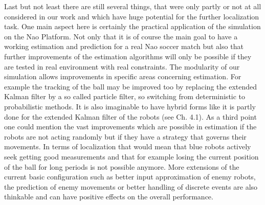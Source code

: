 Last but not least there are still several things, that were only partly or not at all considered in our work and which have huge potential for the further localization task. One main aspect here is certainly the practical application of the simulation on the Nao Platform. Not only that it is of course the main goal to have a working estimation and prediction for a real Nao soccer match but also that further improvements of the estimation algorithms will only be possible if they are tested in real environment with real constraints. The modularity of our simulation allows improvements in specific areas concerning estimation. For example the tracking of the ball may be improved too by replacing the extended Kalman filter by a so called particle filter, so switching from deterministic to probabilistic methods. It is also imaginable to have hybrid forms like it is partly done for the extended Kalman filter of the robots (see Ch. 4.1). As a third point one could mention the vast improvements which are possible in estimation if the robots are not acting randomly but if they have a strategy that governs their movements. In terms of localization that would mean that blue robots actively seek getting good measurements and that for example losing the current position of the ball for long periods is not possible anymore. More extensions of the current basic configuration such as better input approximation of enemy robots, the prediction of enemy movements or better handling of discrete events are also thinkable and can have positive effects on the overall performance.


